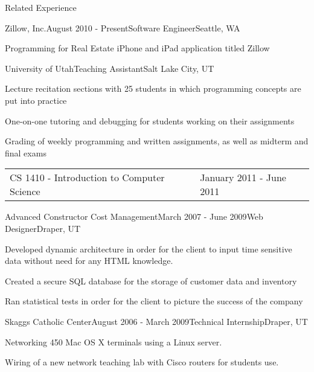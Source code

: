 \documentclass{resume}
\begin{document}
\begin{rSection}{Related Experience}

\begin{experienceZillow}
\begin{rSubsection}{Zillow, Inc.}{August 2010 - Present}{Software Engineer}{Seattle, WA}
\item Programming for Real Estate iPhone and iPad application titled Zillow
\end{rSubsection}
\end{experienceZillow}


\begin{experienceTA}
\begin{rSubsection}{University of Utah}{}{Teaching Assistant}{Salt Lake City, UT}
\item Lecture recitation sections with 25 students in which programming concepts are put into practice
\item One-on-one tutoring and debugging for students working on their assignments
\item Grading of weekly programming and written assignments, as well as midterm and final exams
\\
\begin{tabularx}{\textwidth}{ X l }
CS 1410 - Introduction to Computer Science & January 2011 - June 2011
\end{tabularx}
\end{rSubsection}
\end{experienceTA}


\begin{experienceACCM}
\begin{rSubsection}{Advanced Constructor Cost Management}{March 2007 - June 2009}{Web Designer}{Draper, UT}
\item Developed dynamic architecture in order for the client to input time sensitive data without need for any HTML knowledge.
\item Created a secure SQL database for the storage of customer data and inventory
\item Ran statistical tests in order for the client to picture the success of the company
\end{rSubsection}
\end{experienceACCM}


\begin{experienceJdIntern}
\begin{rSubsection}{Skaggs Catholic Center}{August 2006 - March 2009}{Technical Internship}{Draper, UT}
\item Networking 450 Mac OS X terminals using a Linux server.
\item Wiring of a new network teaching lab with Cisco routers for students use.
\end{rSubsection}
\end{experienceJdIntern}

\end{rSection}
\end{document}
